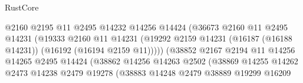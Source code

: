 \begin{lexlean}{RustCore}
\begin{coremodule}
                                              @2160
                                              @2195
                                              @11
                                              @2495
                                              @14232
                                              @14256
                                              @14424
                                              (@36673
                                                @2160
                                                @11
                                                @2495
                                                @14231
                                                (@19333
                                                  @2160
                                                  @11
                                                  @14231
                                                  (@19292
                                                    @2159
                                                    @14231
                                                    (@16187 (@16188 @14231))
                                                    (@16192 (@16194 @2159 @11)))))
                                              (@38852
                                                @2167
                                                @2194
                                                @11
                                                @14256
                                                @14265
                                                @2495
                                                @14424
                                                (@38862
                                                  @14256
                                                  @14263
                                                  @2502
                                                  (@38869
                                                    @14255
                                                    @14262
                                                    @2473
                                                    @14238
                                                    @2479
                                                    @19278
                                                    (@38883
                                                      @14248
                                                      @2479
                                                      @38889
                                                      @19299
                                                      @16209

\end{coremodule}
\end{lexlean}

